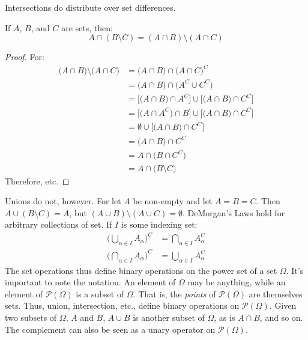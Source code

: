         Intersections do distribute over set differences.
        \begin{theorem}
            If $A$, $B$, and $C$ are sets, then:
            \begin{equation}
                A\cap(B\setminus{C})=
                (A\cap{B})\setminus(A\cap{C})
            \end{equation}
        \end{theorem}
        \begin{proof}
            For:
            \begin{subequations}
                \begin{align}
                    \big(A\cap{B}\big)\setminus
                        \big(A\cap{C}\big)
                    &=\big(A\cap{B}\big)
                        \cap\big(A\cap{C}\big)^{C}\\
                    &=\big(A\cap{B}\big)
                        \cap\big(A^{C}\cup{C}^{C}\big)\\
                    &=\big[\big(A\cap{B}\big)\cap{A}^{C}\big]
                        \cup\big[\big({A}\cap{B}\big)
                        \cap{C}^{C}\big]\\
                    &=\big[\big(A\cap{A}^{C}\big)\cap{B}\big]
                        \cup\big[\big(A\cap{B}\big)
                        \cap{C}^{C}\big]\\
                    &=\emptyset\cup\big[\big(A\cap{B}\big)
                        \cap{C}^{C}\big]\\
                    &=\big(A\cap{B}\big)\cap{C}^{C}\\
                    &=A\cap\big(B\cap{C}^{C}\big)\\
                    &=A\cap\big(B\setminus{C}\big)
                \end{align}
            \end{subequations}
            Therefore, etc.
        \end{proof}
        Unions do not, however. For let $A$ be non-empty
        and let $A=B=C$. Then $A\cup(B\setminus{C})=A$, but
        $(A\cup{B})\setminus(A\cup{C})=\emptyset$.
        DeMorgan's Laws hold for arbitrary collections
        of set. If $I$ is some indexing set:
        \begin{align}
            \Big(\bigcup_{\alpha\in{I}}A_{\alpha}\Big)^{C}
            &=\bigcap_{\alpha\in{I}}A_{\alpha}^{C}\\
            \Big(\bigcap_{\alpha\in{I}}A_{\alpha}\Big)^{C}
            &=\bigcup_{\alpha\in{I}}A_{\alpha}^{C}
        \end{align}
        The set operations thus define binary operations
        on the power set of a set $\Omega$. It's important
        to note the notation. An element of $\Omega$ may
        be anything, while an element of
        $\mathcal{P}(\Omega)$ is a subset of $\Omega$.
        That is, the \textit{points} of $\mathcal{P}(\Omega)$
        are themselves sets. Thus, union, intersection,
        etc., define binary operations on
        $\mathcal{P}(\Omega)$. Given two subsets of
        $\Omega$, $A$ and $B$, $A\cup{B}$ is another
        subset of $\Omega$, as is $A\cap{B}$, and so on.
        The complement can also be seen as a unary operator
        on $\mathcal{P}(\Omega)$.
    \newpage
